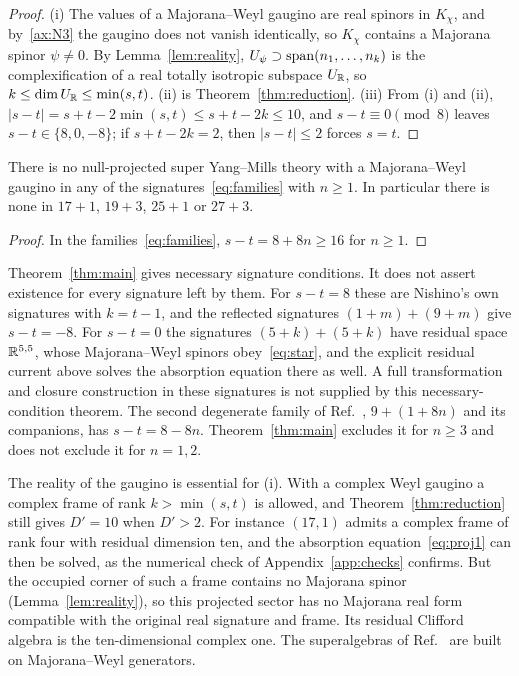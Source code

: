\begin{proof}
(i) The values of a Majorana--Weyl gaugino are real spinors in $K_\chi$, and by~\ref{ax:N3} the gaugino does not vanish identically, so $K_\chi$ contains a Majorana spinor $\psi\ne0$. By Lemma~\ref{lem:reality}, $U_\psi\supset\operatorname{span}(n_1,\dots,n_k)$ is the complexification of a real totally isotropic subspace $U_{\mathbb{R}}$, so $k\le\dim U_{\mathbb{R}}\le\min(s,t)$. (ii) is Theorem~\ref{thm:reduction}. (iii) From (i) and (ii), $|s-t|=s+t-2\min(s,t)\le s+t-2k\le10$, and $s-t\equiv0\pmod8$ leaves $s-t\in\{8,0,-8\}$; if $s+t-2k=2$, then $|s-t|\le2$ forces $s=t$.
\end{proof}

\begin{corollary}
\label{cor:families}
There is no null-projected super Yang--Mills theory with a Majorana--Weyl gaugino in any of the signatures~\eqref{eq:families} with $n\ge1$. In particular there is none in $17+1$, $19+3$, $25+1$ or $27+3$.
\end{corollary}

\begin{proof}
In the families~\eqref{eq:families}, $s-t=8+8n\ge16$ for $n\ge1$.
\end{proof}

Theorem~\ref{thm:main} gives necessary signature conditions. It does not assert existence for every signature left by them. For $s-t=8$ these are Nishino's own signatures with $k=t-1$, and the reflected signatures $(1+m)+(9+m)$ give $s-t=-8$. For $s-t=0$ the signatures $(5+k)+(5+k)$ have residual space $\mathbb{R}^{5,5}$, whose Majorana--Weyl spinors obey~\eqref{eq:star}, and the explicit residual current above solves the absorption equation there as well. A full transformation and closure construction in these signatures is not supplied by this necessary-condition theorem. The second degenerate family of Ref.~\cite{RiosMarraniChester2019}, $9+(1+8n)$ and its companions, has $s-t=8-8n$. Theorem~\ref{thm:main} excludes it for $n\ge3$ and does not exclude it for $n=1,2$.

\begin{remark}
\label{rem:complex}
The reality of the gaugino is essential for (i). With a complex Weyl gaugino a complex frame of rank $k>\min(s,t)$ is allowed, and Theorem~\ref{thm:reduction} still gives $D'=10$ when $D'>2$. For instance $(17,1)$ admits a complex frame of rank four with residual dimension ten, and the absorption equation~\eqref{eq:proj1} can then be solved, as the numerical check of Appendix~\ref{app:checks} confirms. But the occupied corner of such a frame contains no Majorana spinor (Lemma~\ref{lem:reality}), so this projected sector has no Majorana real form compatible with the original real signature and frame. Its residual Clifford algebra is the ten-dimensional complex one. The superalgebras of Ref.~\cite{RiosMarraniChester2019} are built on Majorana--Weyl generators.
\end{remark}

